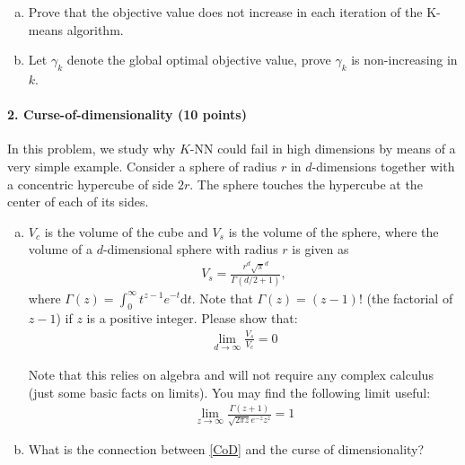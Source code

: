 \documentclass[11pt]{article}
\begin{document}
\begin{enumerate}[(a)]
\item Prove that the objective value does not increase in each iteration of the K-means algorithm. 
\item Let $\gamma_k$ denote the global optimal objective value, prove $\gamma_k$ is non-increasing in $k$.
\end{enumerate}



\paragraph{2. Curse-of-dimensionality (10 points)}
In this problem, we study why $K$-NN could fail in high dimensions by means of a very simple example. Consider a sphere of radius $r$ in $d$-dimensions together with a concentric hypercube of side $2r$. The sphere touches the hypercube at the center of each of its sides.

\begin{enumerate}[(a)]
\item $V_c$ is the volume of the cube and $V_s$ is the volume of the sphere, where the volume of a $d$-dimensional sphere with radius $r$ is given as 
\begin{eqnarray}
V_s = \frac{r^d\sqrt{\pi}^d}{\Gamma(d/2+1)}, \nonumber
\end{eqnarray}
where $\Gamma(z)=\int_0^{\infty}t^{z-1}e^{-t}\textrm{d}t$.  Note that $\Gamma(z) = (z-1)!$ (the factorial of $z-1$) if $z$ is a positive integer.  Please show that: 
\begin{eqnarray}
\lim_{d\rightarrow\infty}\frac{V_s}{V_c} = 0
\label{CoD}
\end{eqnarray}

Note that this relies on algebra and will not require any complex calculus (just some basic facts on limits). You may find the following limit useful:
\begin{eqnarray}
\lim_{z\rightarrow\infty}\frac{\Gamma(z+1)}{\sqrt{2\pi z}e^{-z}z^z}=1 \nonumber
\end{eqnarray}

\item What is the connection between \eqref{CoD} and the curse of dimensionality?
\end{enumerate}
\end{document}
